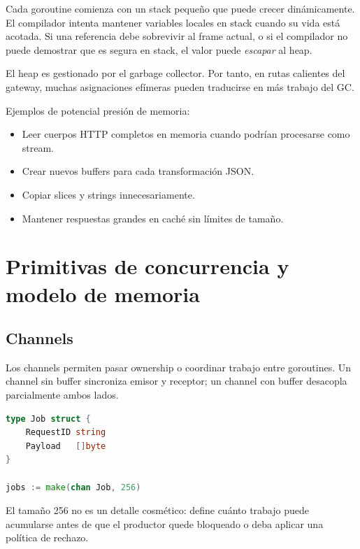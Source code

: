 \documentclass[11pt,a4paper]{article}
\begin{document}
Cada goroutine comienza con un stack pequeño que puede crecer dinámicamente. El compilador intenta mantener variables locales en stack cuando su vida está acotada. Si una referencia debe sobrevivir al frame actual, o si el compilador no puede demostrar que es segura en stack, el valor puede \emph{escapar} al heap.

El heap es gestionado por el garbage collector. Por tanto, en rutas calientes del gateway, muchas asignaciones efímeras pueden traducirse en más trabajo del GC.

Ejemplos de potencial presión de memoria:

\begin{itemize}
  \item Leer cuerpos HTTP completos en memoria cuando podrían procesarse como stream.
  \item Crear nuevos buffers para cada transformación JSON.
  \item Copiar slices y strings innecesariamente.
  \item Mantener respuestas grandes en caché sin límites de tamaño.
\end{itemize}

\section{Primitivas de concurrencia y modelo de memoria}

\subsection{Channels}

Los channels permiten pasar ownership o coordinar trabajo entre goroutines. Un channel sin buffer sincroniza emisor y receptor; un channel con buffer desacopla parcialmente ambos lados.

\begin{lstlisting}[language=Go,caption={Canal con buffer para una cola de trabajos limitada}]
type Job struct {
    RequestID string
    Payload   []byte
}

jobs := make(chan Job, 256)
\end{lstlisting}

El tamaño 256 no es un detalle cosmético: define cuánto trabajo puede acumularse antes de que el productor quede bloqueado o deba aplicar una política de rechazo.
\end{document}
